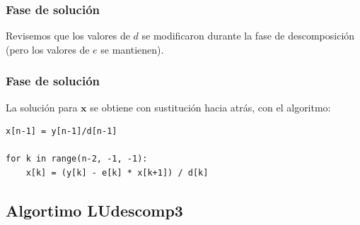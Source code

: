 \documentclass[12pt]{beamer}
\begin{document}
\begin{frame}[fragile]
\frametitle{Fase de solución}
Revisemos que los valores de $d$ se modificaron durante la fase de descomposición (pero los valores de $e$ se mantienen).
\end{frame}
\begin{frame}[fragile]
\frametitle{Fase de solución}
La solución para $\mathbf{x}$ se obtiene con sustitución hacia atrás, con el algoritmo:
\begin{lstlisting}[caption=Sustitución hacia atrás]
x[n-1] = y[n-1]/d[n-1]

for k in range(n-2, -1, -1):
    x[k] = (y[k] - e[k] * x[k+1]) / d[k]
\end{lstlisting}
\end{frame}

\subsection{Algortimo LUdescomp3}
\end{document}
